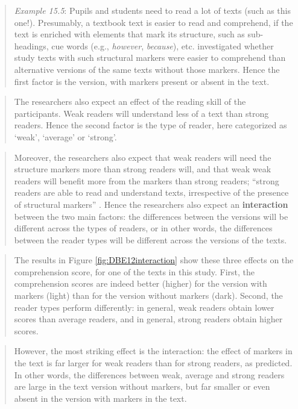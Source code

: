 \documentclass[
]{book}
\begin{document}
\begin{quote}
\emph{Example 15.5}:
Pupils and students need to read a lot of texts (such as this one!).
Presumably, a textbook text is easier to read and comprehend, if the text is enriched with elements that mark its structure, such as sub-headings, cue words (e.g., \emph{however}, \emph{because}), etc.
\citet{DBE12} investigated whether study texts with such structural markers were easier to comprehend than alternative versions of the same texts without those markers. Hence the first factor is the version, with markers present or absent in the text.
\end{quote}

\begin{quote}
The researchers also expect an effect of the reading skill of the participants. Weak readers will understand less of a text than strong readers. Hence the second factor is the type of reader, here categorized as `weak', `average' or `strong'.
\end{quote}

\begin{quote}
Moreover, the researchers also expect that weak readers will need the structure markers more than strong readers will, and that weak weak readers will benefit more from the markers than strong readers; ``strong readers are able to read and understand texts, irrespective of the presence of structural markers'' \citep[p.33, transl.HQ]{DBE12}.
Hence the researchers also expect an \textbf{interaction} between the two main factors: the differences between the versions will be different across the types of readers, or in other words, the differences between the reader types will be different across the versions of the texts.
\end{quote}

\begin{quote}
The results in Figure \ref{fig:DBE12interaction} show these three effects on the comprehension score, for one of the texts in this study. First, the comprehension scores are indeed better (higher) for the version with markers (light) than for the version without markers (dark). Second, the reader types perform differently: in general, weak readers obtain lower scores than average readers, and in general, strong readers obtain higher scores.
\end{quote}

\begin{quote}
However, the most striking effect is the interaction: the effect of markers in the text is far larger for weak readers than for strong readers, as predicted. In other words, the differences between weak, average and strong readers are large in the text version without markers, but far smaller or even absent in the version with markers in the text.
\end{quote}
\end{document}
